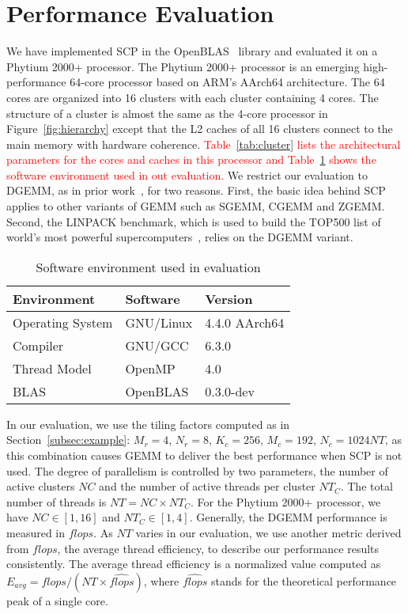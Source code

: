 \section{Performance Evaluation}\label{sec:evaluation}

We have implemented SCP in the OpenBLAS~\cite{openblas} library
and evaluated it on a Phytium 2000+ processor.
The Phytium 2000+ processor is an emerging high-performance
64-core processor based on ARM's AArch64 architecture.
The 64 cores are organized into 16 clusters with each
cluster containing 4 cores.
The structure of a cluster is almost the same as
the 4-core processor in Figure~\ref{fig:hierarchy}
except that the L2 caches of all 16 clusters connect to the main memory
with hardware coherence.
\textcolor{red}{
Table~\ref{tab:cluster} lists the
architectural parameters for the cores and caches
in this processor
and Table~\ref{tab:software} shows the software environment used in out evaluation.}
We restrict our evaluation to DGEMM,
as in prior work~\cite{blispar,augem,poetmicro}, for two reasons.
First, the basic idea behind SCP applies to other
variants of GEMM such as SGEMM, CGEMM and ZGEMM.
Second, the LINPACK benchmark, which is used to build the
TOP500 list of world's most powerful supercomputers~\cite{top500},
relies on the DGEMM variant.

\begin{table}
  \centering
  \caption{Software environment used in evaluation}
  \label{tab:software}
  \begin{tabular}{lll}
    \toprule
    Environment & Software & Version \\
    \midrule
    Operating System & GNU/Linux & 4.4.0 AArch64 \\
    Compiler & GNU/GCC & 6.3.0 \\
    Thread Model & OpenMP & 4.0 \\
    BLAS & OpenBLAS & 0.3.0-dev \\
    \bottomrule
  \end{tabular}
\end{table}


In our evaluation, we use the tiling factors
computed as in Section~\ref{subsec:example}:
$M_r = 4$, $N_r = 8$, $K_c = 256$, $M_c = 192$, $N_c = 1024NT$,
as this combination causes GEMM to deliver the best performance 
when SCP is not used.
The degree of parallelism is controlled by two parameters,
the number of active clusters $NC$
and the number of active threads per cluster $NT_C$.
The total number of threads is $NT = NC \times NT_C$.
For the Phytium 2000+ processor, we have
$NC \in [1, 16]$ and $NT_C \in [1, 4]$. 
Generally, the DGEMM performance is measured in $flops$.
As $NT$ varies in our evaluation,
we use another metric derived from $flops$,
the average thread efficiency,
to describe our performance results consistently.
The average thread efficiency is a normalized value computed as
$E_{avg} = flops / (NT \times \widehat{flops})$,
where $\widehat{flops}$ stands for the theoretical performance
peak of a single core.

